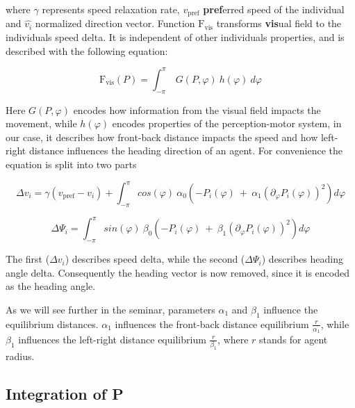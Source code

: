 \documentclass[9pt]{pnas-new}
\begin{document}
where $\gamma$ represents speed relaxation rate, $v_\text{pref}$ \textbf{pref}erred speed of the individual and $\hat{v_i}$ normalized direction vector.
Function $\text{F}_{\text{vis}}$ transforms \textbf{vis}ual field to the individuals speed delta.
It is independent of other individuals properties, and is described with the following equation:

\begin{equation}
    \text{F}_{\text{vis}}(P) = \int_{-\pi}^{\pi} \ G(P, \varphi) \ h(\varphi) \ d\varphi
\end{equation}

Here $G(P, \varphi)$ encodes how information from the visual field impacts the movement, while $h(\varphi)$ encodes properties of the perception-motor system, in our case, it describes how front-back distance impacts the speed and how left-right distance influences the heading direction of an agent.
For convenience the equation is split into two parts
\sloppy

\begin{equation}
    \Delta v_i = \gamma(v_\text{pref} - v_i) +
        \int_{-\pi}^{\pi} cos(\varphi) \ \alpha_0
        \left(
            -P_i(\varphi) \ + \ \alpha_1 (\partial_{\varphi} P_i(\varphi))^2
        \right) d\varphi
    \label{eq:speed}
\end{equation}


\begin{equation}
    \Delta \Psi_i =
        \int_{-\pi}^{\pi}
        sin(\varphi) \ \beta_0
        \left(
            -P_i(\varphi) \ + \ \beta_1 (\partial_{\varphi} P_i(\varphi))^2
        \right) d\varphi
    \label{eq:angle}
\end{equation}

The first ($\Delta v_i$) describes speed delta, while the second ($\Delta \Psi_i$) describes heading angle delta.
Consequently the heading vector is now removed, since it is encoded as the heading angle.

As we will see further in the seminar, parameters $\alpha_1$ and $\beta_1$ influence the equilibrium distances.
$\alpha_1$ influences the front-back distance equilibrium $\frac{r}{\alpha_1}$, while $\beta_1$ influences the left-right distance equilibrium $\frac{r}{\beta_1}$, where $r$ stands for agent radius.






\subsection{Integration of P}
\end{document}
